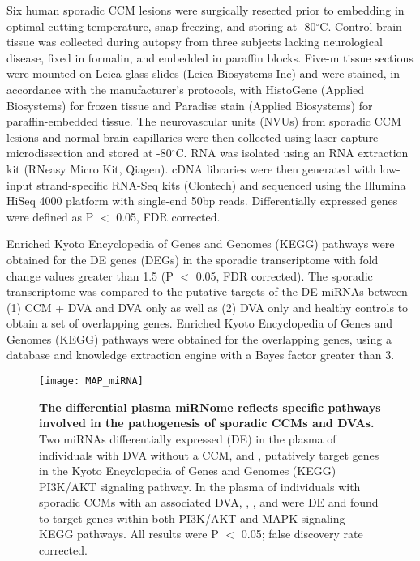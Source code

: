 Six human sporadic CCM lesions were surgically resected prior to embedding in optimal cutting temperature, snap-freezing, and storing at -80$^{\circ}$C. Control brain tissue was collected during autopsy from three subjects lacking neurological disease, fixed in formalin, and embedded in paraffin blocks. Five-\textmu m tissue sections were mounted on Leica glass slides (Leica Biosystems Inc) and were stained, in accordance with the manufacturer’s protocols, with HistoGene (Applied Biosystems) for frozen tissue and Paradise stain (Applied Biosystems) for paraffin-embedded tissue. The neurovascular units (NVUs) from sporadic CCM lesions and normal brain capillaries were then collected using laser capture microdissection and stored at -80$^{\circ}$C. RNA was isolated using an RNA extraction kit (RNeasy Micro Kit, Qiagen). cDNA libraries were then generated with low-input strand-specific RNA-Seq kits (Clontech) and sequenced using the Illumina HiSeq 4000 platform with single-end 50bp reads. Differentially expressed genes were defined as P $<$ 0.05, FDR corrected. 

Enriched Kyoto Encyclopedia of Genes and Genomes (KEGG) pathways\citep{kanehisa2021, kanehisa2000} were obtained for the DE genes (DEGs) in the sporadic transcriptome with fold change values greater than 1.5 (P $<$ 0.05, FDR corrected). The sporadic transcriptome was compared to the putative targets of the DE miRNAs between (1) CCM + DVA and DVA only as well as (2) DVA only and healthy controls to obtain a set of overlapping genes. Enriched Kyoto Encyclopedia of Genes and Genomes (KEGG) pathways were obtained for the overlapping genes, using a database and knowledge extraction engine with a Bayes factor greater than 3. 


\begin{figure}[t!]
\centering
\texttt{[image: MAP\_miRNA]}
\caption{\textbf{The differential plasma miRNome reflects specific pathways involved in the pathogenesis of sporadic CCMs and DVAs. \\} 
Two miRNAs differentially expressed (DE) in the plasma of individuals with DVA without a CCM,  and , putatively target genes in the Kyoto Encyclopedia of Genes and Genomes (KEGG) PI3K/AKT signaling pathway. In the plasma of individuals with sporadic CCMs with an associated DVA, , , and  were DE and found to target genes within both PI3K/AKT and MAPK signaling KEGG pathways. All results were P $<$ 0.05; false discovery rate corrected. }

\label{MAP_miRNA}
\end{figure}

